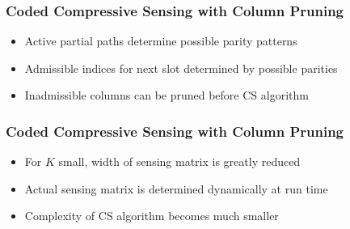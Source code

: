 
\begin{frame}
\frametitle{Coded Compressive Sensing with Column Pruning}
\begin{center}

\end{center}
\vfill
\begin{itemize}
\item Active partial paths determine possible parity patterns
\item Admissible indices for next slot determined by possible parities
\item Inadmissible columns can be pruned before CS algorithm
\end{itemize}
\end{frame}




\begin{frame}
\frametitle{Coded Compressive Sensing with Column Pruning}
\begin{center}

\end{center}
\vfill
\begin{itemize}
\item For $K$ small, width of sensing matrix is greatly reduced
\item Actual sensing matrix is determined dynamically at run time
\item Complexity of CS algorithm becomes much smaller
\end{itemize}
\end{frame}


